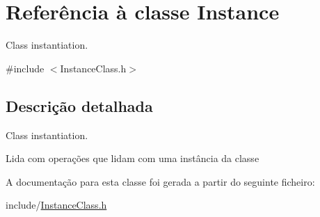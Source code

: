 \hypertarget{classInstance}{}\section{Referência à classe Instance}
\label{classInstance}


Class instantiation.  




{\ttfamily \#include $<$Instance\+Class.\+h$>$}



\subsection{Descrição detalhada}
Class instantiation. 

Lida com operações que lidam com uma instância da classe 

A documentação para esta classe foi gerada a partir do seguinte ficheiro\+:\begin{DoxyCompactItemize}
\item 
include/\hyperlink{InstanceClass_8h}{Instance\+Class.\+h}\end{DoxyCompactItemize}
